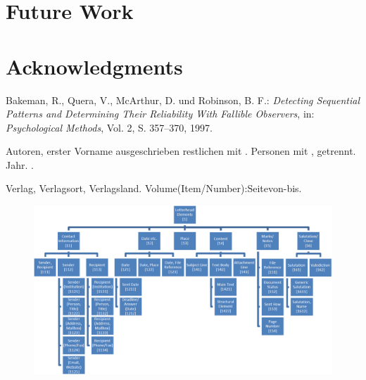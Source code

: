 \documentclass[11pt,a4paper]{article}
\begin{document}
\section{Future Work}
 \label{sec:Future Work}
 

\section*{Acknowledgments}
 
 
 
%
%

\begin{thebibliography}{}

Bakeman, R., Quera, V., McArthur, D. und Robinson, B. F.: {\em Detecting Sequential Patterns and Determining Their Reliability With Fallible Observers}, in: {\em Psychological Methods}, Vol. 2, S. 357--370, 1997. 



{Autoren, erster Vorname ausgeschrieben restlichen mit . Personen mit , getrennt}.
\newblock Jahr.
.

\newblock Verlag, Verlagsort, Verlagsland.
\newblock Volume(Item/Number):Seitevon-bis. 

\end{thebibliography}

\newpage 
\begin{figure}
\includegraphics[scale=0.4]{hKat.png}
\end{figure}
\end{document}
